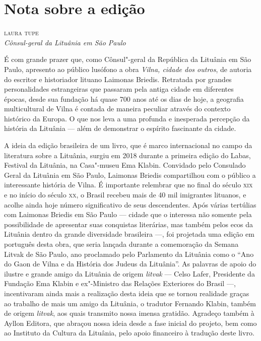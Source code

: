 \chapter[Nota sobre a edição, \textit{por Laura Tupe}]{Nota sobre a edição}

\begin{flushright}
\textsc{laura tupe}\\
\textit{Cônsul-geral da Lituânia em São Paulo}
\end{flushright}

\noindent{}É com grande prazer que, como Cônsul"-geral da República da Lituânia em
São Paulo, apresento ao público lusófono a obra \textit{Vilna, cidade dos
outros}, de autoria do escritor e historiador lituano Laimonas Briedis.
Retratada por grandes personalidades estrangeiras que passaram pela
antiga cidade em diferentes épocas, desde sua fundação há quase 700 anos
até os dias de hoje, a geografia multicultural de Vilna é contada
de maneira peculiar através do contexto histórico da Europa. O que nos
leva a uma profunda e inesperada percepção da história da Lituânia ---
além de demonstrar o espírito fascinante da cidade.

A ideia da edição brasileira de um livro, que é marco internacional no
campo da literatura sobre a Lituânia, surgiu em 2018 durante a primeira
edição do Labas, Festival da Lituânia, na Casa"-museu Ema Klabin.
Convidado pelo Consulado Geral da Lituânia em São Paulo, Laimonas
Briedis compartilhou com o público a interessante história de Vilna. É
importante relembrar que no final do século \textsc{xix} e no início do século
\textsc{xx}, o Brasil recebeu mais de 40 mil imigrantes lituanos, e acolhe ainda
hoje número significativo de seus descendentes. Após várias tertúlias
com Laimonas Briedis em São Paulo --- cidade que o interessa não somente
pela possibilidade de apresentar suas conquistas literárias, mas também
pelos ecos da Lituânia dentro da grande diversidade brasileira ---, foi
projetada uma edição em português desta obra, que seria lançada durante
a comemoração da Semana Litvak de São Paulo, ano proclamado pelo
Parlamento da Lituânia como o ``Ano do Gaon de Vilna e da História
dos Judeus da Lituânia''. As palavras de apoio do ilustre e grande amigo
da Lituânia de origem \textit{litvak} --- Celso Lafer, Presidente da
Fundação Ema Klabin e ex"-Ministro das Relações Exteriores do Brasil ---,
incentivaram ainda mais a realização desta ideia que se tornou realidade
graças ao trabalho de mais um amigo da Lituânia, o tradutor Fernando
Klabin, também de origem \textit{litvak}, aos quais transmito nossa imensa
gratidão. Agradeço também à Ayllon Editora, que abraçou nossa ideia
desde a fase inicial do projeto, bem como ao Instituto da Cultura da
Lituânia, pelo apoio financeiro à tradução deste livro.

